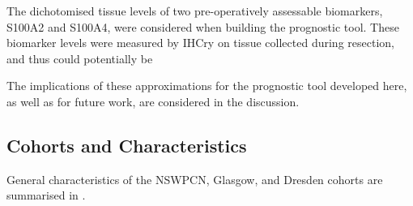\documentclass[dissertation.tex]{subfiles}
\begin{document}
The dichotomised tissue levels of two pre-operatively assessable biomarkers, S100A2 and S100A4, were considered when building the prognostic tool.  These biomarker levels were measured by \gls{IHCry} on tissue collected during resection, and thus could potentially be 

The implications of these approximations for the prognostic tool developed here, as well as for future work, are considered in the discussion.


\subsection{Cohorts and Characteristics}
General characteristics of the \gls{NSWPCN}, Glasgow, and Dresden cohorts are summarised in .
\end{document}
